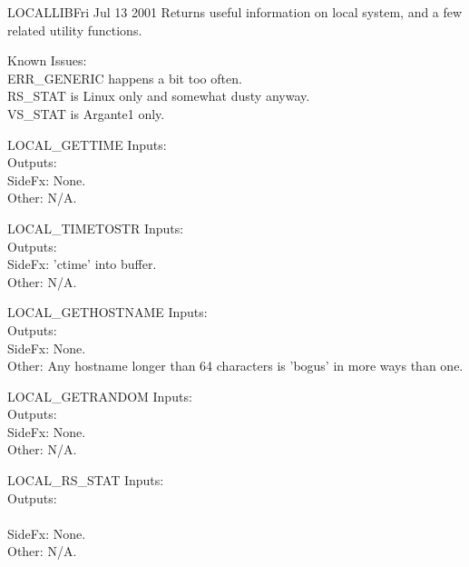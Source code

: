 \begin{scmodule}{LOCALLIB}{\permz}{\perjsk}{Fri Jul 13 2001}
Returns useful information on local system, and a few related utility functions.
\end{scmodule}
Known Issues:\\
ERR\_GENERIC happens a bit too often. \FIXME\\
RS\_STAT is Linux only and somewhat dusty anyway.\\
VS\_STAT is Argante1 only.
\begin{sccall}[]{LOCAL\_GETTIME}
  Inputs: \scargs{}\\
 Outputs: \\
  SideFx: None.\\
   Other: N/A.
\end{sccall}
\begin{sccall}{LOCAL\_TIMETOSTR}
  Inputs: \\
 Outputs: \\
  SideFx: 'ctime' into buffer.\\
   Other: N/A.
\end{sccall}
\begin{sccall}[]{LOCAL\_GETHOSTNAME}
  Inputs: \\
 Outputs: \\
  SideFx: None.\\
   Other: Any hostname longer than 64 characters is 'bogus' in more ways than one.
\end{sccall}
\begin{sccall}[]{LOCAL\_GETRANDOM}
  Inputs: \scargs{}\\
 Outputs: \\
  SideFx: None.\\
   Other: N/A.
\end{sccall}
\begin{sccall}[]{LOCAL\_RS\_STAT}
  Inputs: \scargs{}\\
 Outputs:\\
\\
  SideFx: None.\\
   Other: N/A.
\end{sccall}
